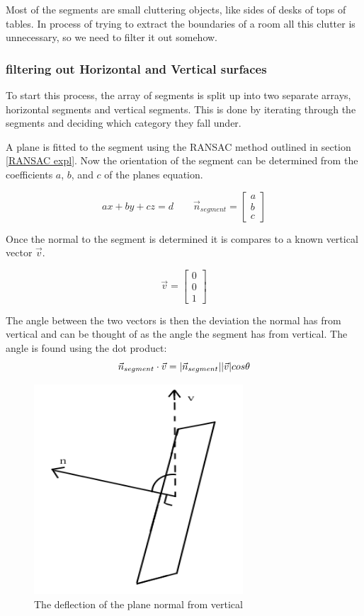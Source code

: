 		Most of the segments are small cluttering objects, like sides of desks of tops of tables. In process of trying to extract the boundaries of a room all this clutter is unnecessary, so we need to filter it out somehow.
		\subsubsection{filtering out Horizontal and Vertical surfaces}
		\label{Filtering}
			To start this process, the array of segments is split up into two separate arrays, horizontal segments and vertical segments. This is done by iterating through the segments and deciding which category they fall under.
			
			A plane is fitted to the segment using the RANSAC method outlined in section \ref{RANSAC expl}. Now the orientation of the segment can be determined from the coefficients $a$, $b$, and $c$ of the planes equation.
			
			\begin{equation}
			ax + by + cz = d  \quad\quad
			\vec{n}_{segment} = \begin{bmatrix}a\\b\\c\end{bmatrix}
			\end{equation}
			
			Once the normal to the segment is determined it is compares to a known vertical vector $\vec{v}$. 
			
			\begin{equation}
			\vec{v} = \begin{bmatrix}0\\0\\1\end{bmatrix}
			\end{equation}
			
			The angle between the two vectors is then the deviation the normal has from vertical and can be thought of as the angle the segment has from vertical. The angle is found using the dot product:
			\label{DotProdSec}
			\begin{equation}
			\vec{n}_{segment}\cdot \vec{v} = \lvert \vec{n}_{segment} \rvert \lvert \vec{v} \rvert cos \theta
			\end{equation}
			\begin{figure}[H]
				\centering
				\includegraphics[width=0.4\linewidth]{"Includes/images/normal to plane"}
				\caption{The deflection of the plane normal from vertical}
				\label{fig:normaltoplane}
			\end{figure}


